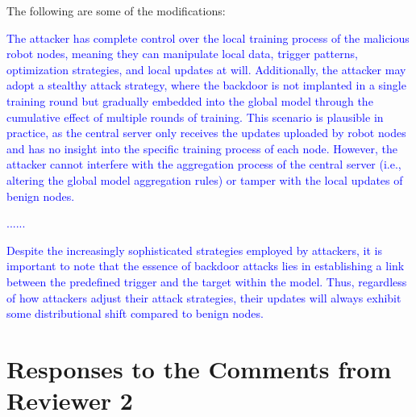 \documentclass[a4paper,twoside,11pt,dvipsnames]{reviewresponse}
\begin{document}
The following are some of the modifications:

\textcolor{blue}{The attacker has complete control over the local training process of the malicious robot nodes, meaning they can manipulate local data, trigger patterns, optimization strategies, and local updates at will. Additionally, the attacker may adopt a stealthy attack strategy, where the backdoor is not implanted in a single training round but gradually embedded into the global model through the cumulative effect of multiple rounds of training. This scenario is plausible in practice, as the central server only receives the updates uploaded by robot nodes and has no insight into the specific training process of each node. However, the attacker cannot interfere with the aggregation process of the central server (i.e., altering the global model aggregation rules) or tamper with the local updates of benign nodes.}

\textcolor{blue}{......}

\textcolor{blue}{Despite the increasingly sophisticated strategies employed by attackers, it is important to note that the essence of backdoor attacks lies in establishing a link between the predefined trigger and the target within the model. Thus, regardless of how attackers adjust their attack strategies, their updates will always exhibit some distributional shift compared to benign nodes.}


\newpage

\section{Responses to the Comments from Reviewer 2}





\end{document}
